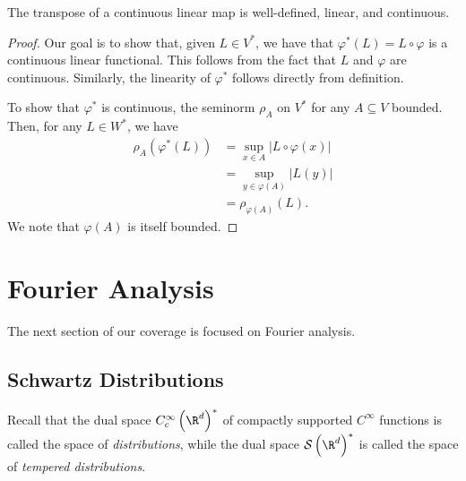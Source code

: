 \documentclass[10pt]{mypackage}
\begin{document}
\begin{proposition}
  The transpose of a continuous linear map is well-defined, linear, and continuous.
\end{proposition}
\begin{proof}
  Our goal is to show that, given $L\in V^{\ast}$, we have that $\varphi^{\ast}\left( L \right) = L\circ \varphi$ is a continuous linear functional. This follows from the fact that $L$ and $\varphi$ are continuous. Similarly, the linearity of $\varphi^{\ast}$ follows directly from definition.

  To show that $\varphi^{\ast}$ is continuous, the seminorm $\rho_A$ on $V^{\ast}$ for any $A\subseteq V$ bounded. Then, for any $L\in W^{\ast}$, we have
  \begin{align*}
    \rho_A\left( \varphi^{\ast}\left( L \right) \right) &= \sup_{x\in A} \left\vert L\circ \varphi(x) \right\vert\\
                                                        &= \sup_{y\in \varphi(A)} \left\vert L(y) \right\vert\\
                                                        &= \rho_{\varphi(A)}\left( L \right).
  \end{align*}
  We note that $\varphi(A)$ is itself bounded.
\end{proof}
\section{Fourier Analysis}%
The next section of our coverage is focused on Fourier analysis.
\subsection{Schwartz Distributions}%
Recall that the dual space $C_c^{\infty}\left( \R^d \right)^{\ast}$ of compactly supported $C^{\infty}$ functions is called the space of \textit{distributions}, while the dual space $ \mathcal{S}\left( \R^d \right)^{\ast} $ is called the space of \textit{tempered distributions}.
\end{document}
